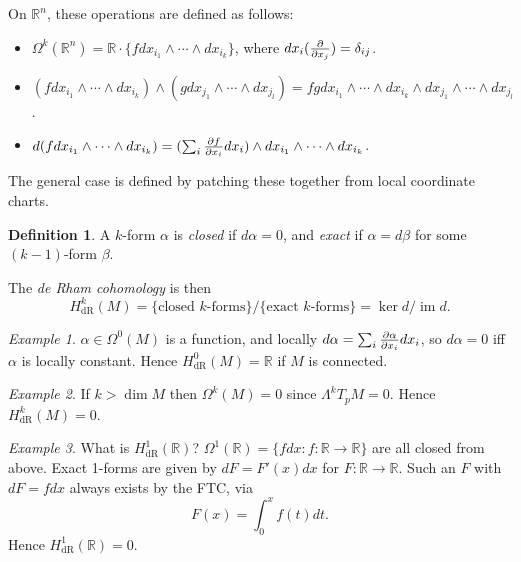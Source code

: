 \documentclass[a4paper]{article}
\theoremstyle{definition}
\newtheorem*{definition}{Definition}
\theoremstyle{remark}
\newtheorem*{example}{Example}
\DeclareMathOperator{\im}{im}
\newcommand{\dR}{\text{dR}}
\newcommand{\R}{\mathbb{R}}
\begin{document}
On $\R^n$, these operations are defined as follows:
\begin{itemize}
    \item $\Omega^k(\R^n)=\R\cdot\{fdx_{i_1}\wedge\cdots\wedge dx_{i_k}\}$,
        where $dx_i(\pdv{}{x_j})=\delta_{ij}$.

    \item $(fdx_{i_1}\wedge\cdots\wedge dx_{i_k})
                \wedge(gdx_{j_1}\wedge\cdots\wedge dx_{j_l})
            = fgdx_{i_1}\wedge\cdots\wedge dx_{i_k}
                \wedge dx_{j_1}\wedge\cdots\wedge dx_{j_l}$.

    \item $d(fdx_{i_1}\wedge\cdots\wedge dx_{i_k})
        = (\sum_i\pdv{f}{x_i}dx_i)\wedge dx_{i_1}\wedge\cdots\wedge dx_{i_k}$.
\end{itemize}
The general case is defined by patching these together from local coordinate
charts.

\begin{definition}
    A $k$-form $\alpha$ is \emph{closed} if $d\alpha=0$, and \emph{exact} if
    $\alpha=d\beta$ for some $(k-1)$-form $\beta$.

    The \emph{de Rham cohomology} is then
    \begin{equation*}
        H^k_\dR(M)
            = \{\text{closed $k$-forms}\}/\{\text{exact $k$-forms}\}
            = \ker d/\im d.
    \end{equation*}
\end{definition}

\begin{example}
    $\alpha\in\Omega^0(M)$ is a function, and locally
    $d\alpha=\sum_i\pdv{\alpha}{x_i}dx_i$, so $d\alpha=0$ iff $\alpha$ is
    locally constant. Hence $H^0_\dR(M)=\R$ if $M$ is connected.
\end{example}

\begin{example}
    If $k>\dim M$ then $\Omega^k(M)=0$ since $\Lambda^kT_pM=0$. Hence
    $H^k_\dR(M)=0$.
\end{example}

\begin{example}
    What is $H^1_\dR(\R)$? $\Omega^1(\R)=\{fdx:f:\R\to\R\}$ are all closed from
    above. Exact 1-forms are given by $dF=F'(x)dx$ for $F:\R\to\R$. Such an $F$
    with $dF=fdx$ always exists by the FTC, via
    \begin{equation*}
        F(x) = \int_0^xf(t)dt.
    \end{equation*}
    Hence $H^1_\dR(\R)=0$.
\end{example}
\end{document}
